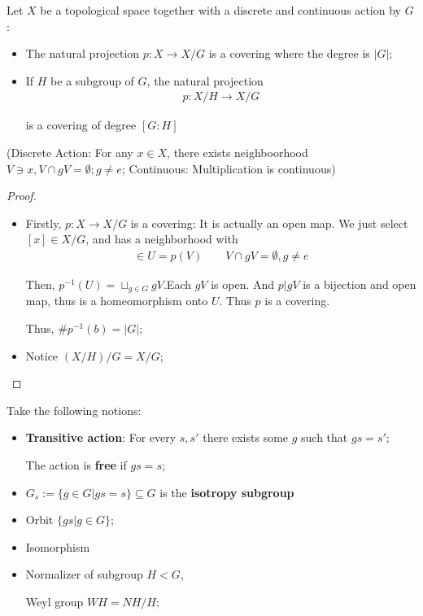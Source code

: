 \documentclass[Total.tex]{subfiles}
\begin{document}
			\begin{proposition}
				Let $X$ be a topological space together with a discrete and continuous action by $G$:
				\begin{itemize}
					\item The natural projection $p:X\rightarrow X/G$ is a covering where the degree is $|G|$;
					\item If $H$ be a subgroup of $G$, the natural projection
					\begin{gather*}
						p:X/H\rightarrow X/G
					\end{gather*}
					
					is a covering of degree $[G:H]$
				\end{itemize}
				
				(Discrete Action: For any $x\in X$, there exists neighboorhood $V\ni x,V\cap gV=\emptyset;g\not=e$; Continuous: Multiplication is continuous)
			\end{proposition}
			\begin{proof}
				\begin{itemize}
					\item Firstly, $p:X\rightarrow X/G$ is a covering: It is actually an open map.  We just select $[x]\in X/G$, and has a neighborhood with
					\begin{gather*}
						[x]\in U=p(V)\qquad V\cap gV=\emptyset,g\not=e 
					\end{gather*}
					
					Then, $p^{-1}(U)=\sqcup_{g\in G} gV$.Each $gV$ is open. And $p|gV$ is a bijection and open map, thus is a homeomorphism onto $U$. Thus $p$ is a covering. 
					
					Thus, $\#p^{-1}(b)=|G|$;
					\item Notice $(X/H)/G=X/G$;
				\end{itemize}
			\end{proof}
			
			\begin{Def}
				Take the following notions:
				\begin{itemize}
					\item \textbf{Transitive action}: For every $s,s'$ there exists some $g$ such that $gs=s'$;
					
					The action is \textbf{free} if $gs=s$;
					\item $G_s:=\{g\in G|gs=s\}\subseteq G$ is the \textbf{isotropy subgroup}
					\item Orbit $\{gs|g\in G\}$;
					\item Isomorphism 
					\item Normalizer of subgroup $H<G$,
					
					Weyl group $WH=NH/H$;
					
				\end{itemize}
			\end{Def}
			
\end{document}
